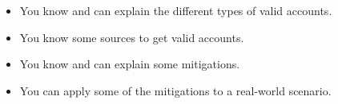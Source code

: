 \begin{itemize}
    \item You know and can explain the different types of valid accounts.
    \item You know some sources to get valid accounts.
    \item You know and can explain some mitigations.
    \item You can apply some of the mitigations to a real-world scenario.    
\end{itemize}